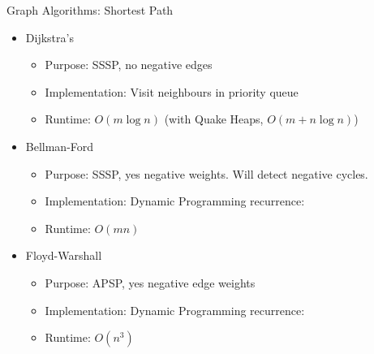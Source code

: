 \documentclass{beamer}
\begin{document}
\begin{frame}[t]{Graph Algorithms: Shortest Path}
  \begin{itemize}
    \item \alert{Dijkstra's}
    \begin{itemize}
        \item \alert{Purpose:} SSSP, no negative edges
        \item \alert{Implementation:} Visit neighbours in \alert{priority queue}
        \item \alert{Runtime:} $O(m \log n)$ (with \alert{Quake Heaps}, $O(m+n \log n)$)
    \end{itemize}
    \pause
    \item \alert{Bellman-Ford}
    \begin{itemize}
        \item \alert{Purpose:} SSSP, yes negative weights. Will detect negative cycles.
        \item \alert{Implementation:} Dynamic Programming recurrence:
        \item \alert{Runtime:} $O(mn)$
    \end{itemize}
    \pause
    \item \alert{Floyd-Warshall}
    \begin{itemize}
        \item \alert{Purpose:} APSP, yes negative edge weights
        \item \alert{Implementation:} Dynamic Programming recurrence:
        \item \alert{Runtime:} $O(n^3)$
    \end{itemize}
  \end{itemize}
\end{frame}
\end{document}
